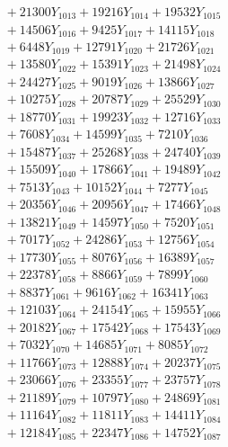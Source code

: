 \documentclass[a4paper,10pt]{article}
\begin{document}
{\begin{align}
&\;  + 21300 Y_{1013} + 19216 Y_{1014} + 19532 Y_{1015} \\[0.3ex]
&\;  + 14506 Y_{1016} + 9425 Y_{1017} + 14115 Y_{1018} \\[0.5ex]\allowbreak
&\;  + 6448 Y_{1019} + 12791 Y_{1020} + 21726 Y_{1021} \\[0.3ex]
&\;  + 13580 Y_{1022} + 15391 Y_{1023} + 21498 Y_{1024} \\[0.3ex]
&\;  + 24427 Y_{1025} + 9019 Y_{1026} + 13866 Y_{1027} \\[0.3ex]
&\;  + 10275 Y_{1028} + 20787 Y_{1029} + 25529 Y_{1030} \\[0.3ex]
&\;  + 18770 Y_{1031} + 19923 Y_{1032} + 12716 Y_{1033} \\[0.3ex]
&\;  + 7608 Y_{1034} + 14599 Y_{1035} + 7210 Y_{1036} \\[0.3ex]
&\;  + 15487 Y_{1037} + 25268 Y_{1038} + 24740 Y_{1039} \\[0.3ex]
&\;  + 15509 Y_{1040} + 17866 Y_{1041} + 19489 Y_{1042} \\[0.3ex]
&\;  + 7513 Y_{1043} + 10152 Y_{1044} + 7277 Y_{1045} \\[0.3ex]
&\;  + 20356 Y_{1046} + 20956 Y_{1047} + 17466 Y_{1048} \\[0.5ex]\allowbreak
&\;  + 13821 Y_{1049} + 14597 Y_{1050} + 7520 Y_{1051} \\[0.3ex]
&\;  + 7017 Y_{1052} + 24286 Y_{1053} + 12756 Y_{1054} \\[0.3ex]
&\;  + 17730 Y_{1055} + 8076 Y_{1056} + 16389 Y_{1057} \\[0.3ex]
&\;  + 22378 Y_{1058} + 8866 Y_{1059} + 7899 Y_{1060} \\[0.3ex]
&\;  + 8837 Y_{1061} + 9616 Y_{1062} + 16341 Y_{1063} \\[0.3ex]
&\;  + 12103 Y_{1064} + 24154 Y_{1065} + 15955 Y_{1066} \\[0.3ex]
&\;  + 20182 Y_{1067} + 17542 Y_{1068} + 17543 Y_{1069} \\[0.3ex]
&\;  + 7032 Y_{1070} + 14685 Y_{1071} + 8085 Y_{1072} \\[0.3ex]
&\;  + 11766 Y_{1073} + 12888 Y_{1074} + 20237 Y_{1075} \\[0.3ex]
&\;  + 23066 Y_{1076} + 23355 Y_{1077} + 23757 Y_{1078} \\[0.5ex]\allowbreak
&\;  + 21189 Y_{1079} + 10797 Y_{1080} + 24869 Y_{1081} \\[0.3ex]
&\;  + 11164 Y_{1082} + 11811 Y_{1083} + 14411 Y_{1084} \\[0.3ex]
&\;  + 12184 Y_{1085} + 22347 Y_{1086} + 14752 Y_{1087} \\[0.3ex]

\end{align}}
\end{document}
